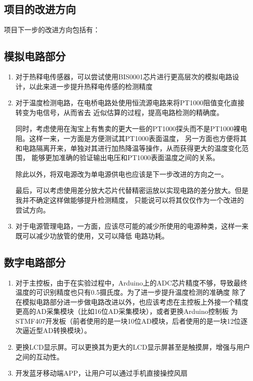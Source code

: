 \documentclass{article}
\begin{document}
\begin{spacing}{1.5}
\section{项目的改进方向}

项目下一步的改进方向包括有：

    \subsection{模拟电路部分}

    \begin{enumerate}
        \item 对于热释电传感器，可以尝试使用BIS0001芯片进行更高层次的模拟电路设计，以此来进一步提升热释电传感的检测精度
        \item 对于温度检测电路，在电桥电路处使用恒流源电路来将PT1000阻值变化直接转变为电信号，从而省去
        近似估算的过程，提高电路检测的精确度。
        
        同时，考虑使用在淘宝上有售卖的更大一些的PT1000探头而不是PT1000裸电阻。这样一来，一方面是方便测试其PT1000表面温度，
        另一方面也方便将其和电路隔离开来，单独对其进行加热降温等操作，从而获得更大的温度变化范围，
        能够更加准确的验证输出电压和PT1000表面温度之间的关系。

        除此以外，将双电源改为单电源供电也应该是下一步改进的方向之一。

        最后，可以考虑使用差分放大芯片代替精密运放以实现电路的差分放大。但是我并不确定这样做能够提升检测精度，
        只能说可以将其仅仅作为一个改进的尝试方向。

        \item 对于电源管理电路，一方面，应该尽可能的减少所使用的电源种类，这样一来既可以减少功放管的使用，又可以降低
        电路功耗。

    \end{enumerate}

    \subsection{数字电路部分}

    \begin{enumerate}
        \item 对于主控板，由于在实验过程中，Arduino上的ADC芯片精度不够，导致最终温度的可识别精度也只有0.5摄氏度。为了进一步提升温度检测的准确度
        除了在模拟电路部分进一步做电路改进以外，也应该考虑在主控板上外接一个精度更高的AD采集模块（比如16位AD采集模块），或者更换Arduino控制板
        为STMF407开发板（前者使用的是一块10位AD模块，后者使用的是一块12位逐次逼近型AD转换模块）。

        \item 更换LCD显示屏。可以更换其为更大的LCD显示屏甚至是触摸屏，增强与用户之间的互动性。
        
        \item 开发蓝牙移动端APP，让用户可以通过手机直接操控风扇
    
    \end{enumerate}

\end{spacing}
\end{document}

